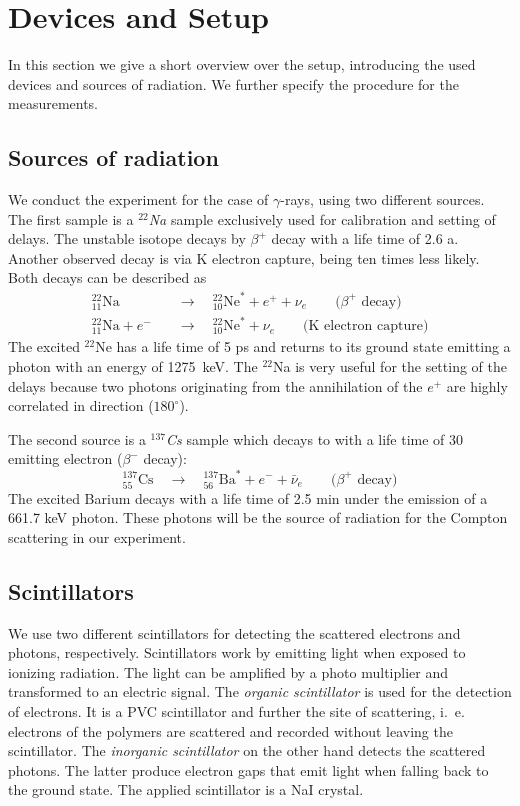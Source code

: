 \section{Devices and Setup}
In this section we give a short overview over the setup, introducing the used devices and sources of radiation. We
further specify the procedure for the measurements. 

\subsection{Sources of radiation}
\label{sec:sources}
We conduct the experiment for the case of $\gamma$-rays, using two different sources. The first sample is a 
\textit{$^{22}$Na}  sample exclusively used for calibration and setting of delays. The unstable isotope decays by 
$\beta^+$ decay with a life time of 2.6 a. Another observed decay is via K electron capture, being ten times less likely. 
Both decays can be described as
\begin{align}
_{11}^{22}\text{Na}        \quad &\rightarrow \quad _{10}^{22}\text{Ne}^* + e^+ + \nu_e	\qquad \text{($\beta^+$ decay)} \\
_{11}^{22}\text{Na} + e^-  \quad &\rightarrow \quad _{10}^{22}\text{Ne}^* + \nu_e  \qquad \text{(K electron capture)}
    \label{eq:22na_decay}
\end{align}
The excited $^{22}$Ne has a life time of 5 ps and returns to its ground state emitting a photon with an energy of 
1275~keV.\cite{lnhb} The $^{22}$Na is very useful for the setting of the delays because two photons originating from the 
annihilation of the $e^+$ are highly correlated in direction ($180^\circ$).\cite{ver}

The second source is a \textit{$^{137}$Cs} sample which decays to with a life time of 30 emitting electron 
($\beta^-$ decay):
\begin{equation}
_{55}^{137}\text{Cs} \quad \rightarrow \quad _{56}^{137}\text{Ba}^* + e^- + \bar{\nu}_e \qquad \text{($\beta^+$ decay)}
    \label{eq:137cs_decay}
\end{equation}
The excited Barium decays with a life time of 2.5 min under the emission of a 661.7 keV photon. These photons will be the 
source of radiation for the Compton scattering in our experiment.

\subsection{Scintillators}
\label{sec:scinti}
We use two different scintillators for detecting the scattered electrons and photons, respectively. Scintillators work by 
emitting light when exposed to ionizing radiation. The light can be amplified by a photo multiplier and transformed to an 
electric signal. 
The \textit{organic scintillator} is used for the detection of electrons. It is a PVC scintillator and further the site of 
scattering, i.~e. electrons of the polymers are scattered and recorded without leaving the scintillator. The 
\textit{inorganic scintillator} on the other hand detects the scattered photons. The latter produce electron gaps that 
emit light when falling back to the ground state. The applied scintillator is a NaI crystal. 



